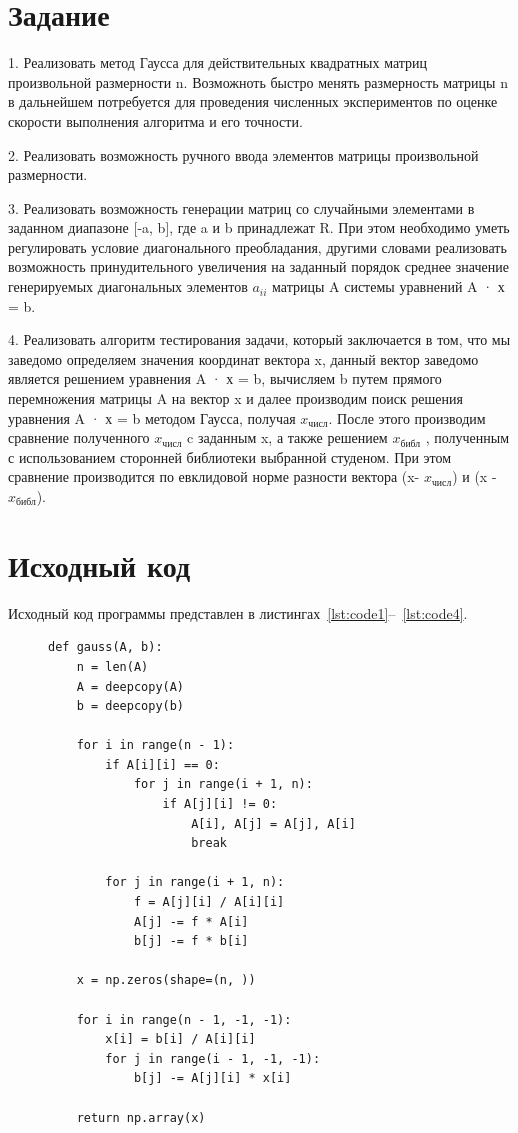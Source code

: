 \documentclass[a4paper, 14pt]{extarticle}
\begin{document}
\renewcommand{\ttdefault}{pcr}

\setlength{\tabcolsep}{3pt}
\newpage
\setcounter{page}{2}

\section{Задание}\label{Sect::task}
1. Реализовать метод Гаусса для действительных квадратных матриц произвольной
размерности n. Возможноть быстро менять размерность матрицы n в дальнейшем
потребуется для проведения численных экспериментов по оценке скорости
выполнения алгоритма и его точности.

2. Реализовать возможность ручного ввода элементов матрицы произвольной
размерности.

3. Реализовать возможность генерации матриц со случайными элементами в заданном
диапазоне [-a, b], где a и b принадлежат R. При этом необходимо уметь регулировать
условие диагонального преобладания, другими словами реализовать возможность
принудительного увеличения на заданный порядок среднее значение генерируемых
диагональных элементов $a_{ii}$ матрицы A системы уравнений A · х = b.

4. Реализовать алгоритм тестирования задачи, который заключается в том, что мы
заведомо определяем значения координат вектора x, данный вектор заведомо является
решением уравнения A · х = b, вычисляем b путем прямого перемножения матрицы A
на вектор x и далее производим поиск решения уравнения A · х = b методом Гаусса, получая $x_{\text{числ}}$. После этого производим сравнение полученного $x_{\text{числ}}$ c заданным x, а также решением $x_{\text{библ}}$ , полученным с использованием сторонней библиотеки
выбранной студеном. При этом сравнение производится по евклидовой норме
разности вектора (x- $x_{\text{числ}}$) и (x - $x_{\text{библ}}$).
\newpage
\section{Исходный код}

Исходный код программы представлен в листингах~\ref{lst:code1}--~\ref{lst:code4}.

\begin{figure}[H]
\begin{lstlisting}[language={},caption={Метод Гаусса},label={lst:code1}]
def gauss(A, b):
    n = len(A)
    A = deepcopy(A)
    b = deepcopy(b)

    for i in range(n - 1):
        if A[i][i] == 0:
            for j in range(i + 1, n):
                if A[j][i] != 0:
                    A[i], A[j] = A[j], A[i]
                    break

        for j in range(i + 1, n):
            f = A[j][i] / A[i][i]
            A[j] -= f * A[i]
            b[j] -= f * b[i]

    x = np.zeros(shape=(n, ))

    for i in range(n - 1, -1, -1):
        x[i] = b[i] / A[i][i]
        for j in range(i - 1, -1, -1):
            b[j] -= A[j][i] * x[i]

    return np.array(x)
\end{lstlisting}
\end{figure}
\end{document}
